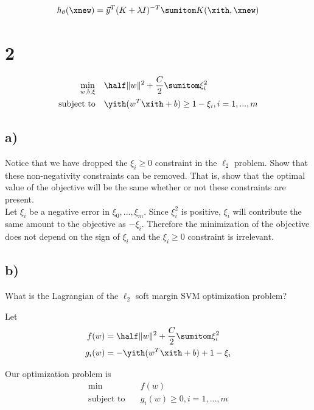 \documentclass[11pt]{article}
\begin{document}
\begin{align*}
  h_{\theta}(\xnew) &= \vec{y}^{T} (K + \lambda I)^{-T} \sumitom K(\xith, \xnew) \\
\end{align*}

\section*{2}

\begin{align*}
  \underset{w,b,\xi}{\text{min}} &\quad \half \|w\|^{2} + \frac{C}{2} \sumitom \xi_{i}^{2} \\
  \text{subject to} &\quad \yith (w^{T} \xith + b) \geq 1 - \xi_i, i = 1,...,m \\
\end{align*}

\subsection*{a)}

Notice that we have dropped the $\xi_{i} \geq 0$ constraint in the $\ell_2$ problem. Show that these non-negativity constraints can be removed. That is, show that the optimal value of the objective will be the same whether or not these constraints are present. \\

Let $\xi_i$ be a negative error in $\xi_0,...,\xi_m$. Since $\xi_i^{2}$ is positive, $\xi_i$ will contribute the same amount to the objective as $-\xi_i$. Therefore the minimization of the objective does not depend on the sign of $\xi_i$ and the $\xi_i \geq 0$ constraint is irrelevant.

\subsection*{b)}

What is the Lagrangian of the $\ell_2$ soft margin SVM optimization problem?

Let
\begin{align*}
  f(w)   &= \half \|w\|^{2} + \frac{C}{2} \sumitom \xi_i^2 \\
  g_i(w) &= -\yith (w^T \xith + b) + 1 - \xi_i \\
\end{align*}

Our optimization problem is
\begin{align*}
  \text{min}        &\quad f(w) \\
  \text{subject to} &\quad g_i(w) \geq 0, i = 1,...,m \\
\end{align*}
\end{document}
